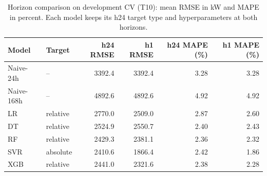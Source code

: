 \begin{table}[H]\centering\small
\caption{Horizon comparison on development CV (T10): mean RMSE in kW and MAPE in percent. Each model keeps its h24 target type and hyperparameters at both horizons.}\label{tab:horizon}
\setlength{\tabcolsep}{4pt}
\begin{tabular}{llrrrr}
\toprule
Model & Target & h24 RMSE & h1 RMSE & h24 MAPE (\%) & h1 MAPE (\%) \\
\midrule
Naive-24h & -- & \num{3392.4} & \num{3392.4} & \num{3.28} & \num{3.28} \\
Naive-168h & -- & \num{4892.6} & \num{4892.6} & \num{4.92} & \num{4.92} \\
LR & relative & \num{2770.0} & \num{2509.0} & \num{2.87} & \num{2.60} \\
DT & relative & \num{2524.9} & \num{2550.7} & \num{2.40} & \num{2.43} \\
RF & relative & \num{2429.3} & \num{2381.1} & \num{2.36} & \num{2.32} \\
SVR & absolute & \num{2410.6} & \num{1866.4} & \num{2.42} & \num{1.86} \\
XGB & relative & \num{2441.0} & \num{2321.6} & \num{2.38} & \num{2.28} \\
\bottomrule\end{tabular}
\end{table}
